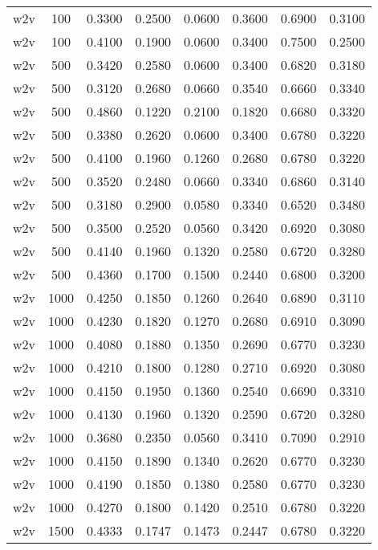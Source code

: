\begin{scriptsize}
\begin{longtable}{cccccccc}
	w2v      & 100  & 0.3300 & 0.2500 & 0.0600 & 0.3600 & 0.6900 & 0.3100 \\
	w2v      & 100  & 0.4100 & 0.1900 & 0.0600 & 0.3400 & 0.7500 & 0.2500 \\
	w2v      & 500  & 0.3420 & 0.2580 & 0.0600 & 0.3400 & 0.6820 & 0.3180 \\
	w2v      & 500  & 0.3120 & 0.2680 & 0.0660 & 0.3540 & 0.6660 & 0.3340 \\
	w2v      & 500  & 0.4860 & 0.1220 & 0.2100 & 0.1820 & 0.6680 & 0.3320 \\
	w2v      & 500  & 0.3380 & 0.2620 & 0.0600 & 0.3400 & 0.6780 & 0.3220 \\
	w2v      & 500  & 0.4100 & 0.1960 & 0.1260 & 0.2680 & 0.6780 & 0.3220 \\
	w2v      & 500  & 0.3520 & 0.2480 & 0.0660 & 0.3340 & 0.6860 & 0.3140 \\
	w2v      & 500  & 0.3180 & 0.2900 & 0.0580 & 0.3340 & 0.6520 & 0.3480 \\
	w2v      & 500  & 0.3500 & 0.2520 & 0.0560 & 0.3420 & 0.6920 & 0.3080 \\
	w2v      & 500  & 0.4140 & 0.1960 & 0.1320 & 0.2580 & 0.6720 & 0.3280 \\
	w2v      & 500  & 0.4360 & 0.1700 & 0.1500 & 0.2440 & 0.6800 & 0.3200 \\
	w2v      & 1000 & 0.4250 & 0.1850 & 0.1260 & 0.2640 & 0.6890 & 0.3110 \\
	w2v      & 1000 & 0.4230 & 0.1820 & 0.1270 & 0.2680 & 0.6910 & 0.3090 \\
	w2v      & 1000 & 0.4080 & 0.1880 & 0.1350 & 0.2690 & 0.6770 & 0.3230 \\
	w2v      & 1000 & 0.4210 & 0.1800 & 0.1280 & 0.2710 & 0.6920 & 0.3080 \\
	w2v      & 1000 & 0.4150 & 0.1950 & 0.1360 & 0.2540 & 0.6690 & 0.3310 \\
	w2v      & 1000 & 0.4130 & 0.1960 & 0.1320 & 0.2590 & 0.6720 & 0.3280 \\
	w2v      & 1000 & 0.3680 & 0.2350 & 0.0560 & 0.3410 & 0.7090 & 0.2910 \\
	w2v      & 1000 & 0.4150 & 0.1890 & 0.1340 & 0.2620 & 0.6770 & 0.3230 \\
	w2v      & 1000 & 0.4190 & 0.1850 & 0.1380 & 0.2580 & 0.6770 & 0.3230 \\
	w2v      & 1000 & 0.4270 & 0.1800 & 0.1420 & 0.2510 & 0.6780 & 0.3220 \\
	w2v      & 1500 & 0.4333 & 0.1747 & 0.1473 & 0.2447 & 0.6780 & 0.3220 \\

\end{longtable}
\end{scriptsize}
